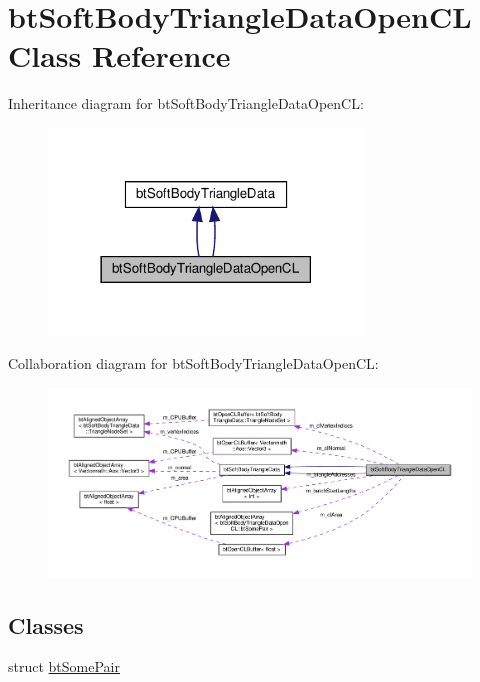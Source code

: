 \hypertarget{classbtSoftBodyTriangleDataOpenCL}{}\section{bt\+Soft\+Body\+Triangle\+Data\+Open\+CL Class Reference}
\label{classbtSoftBodyTriangleDataOpenCL}


Inheritance diagram for bt\+Soft\+Body\+Triangle\+Data\+Open\+CL\+:
\nopagebreak
\begin{figure}[H]
\begin{center}
\leavevmode
\includegraphics[width=237pt]{classbtSoftBodyTriangleDataOpenCL__inherit__graph}
\end{center}
\end{figure}


Collaboration diagram for bt\+Soft\+Body\+Triangle\+Data\+Open\+CL\+:
\nopagebreak
\begin{figure}[H]
\begin{center}
\leavevmode
\includegraphics[width=350pt]{classbtSoftBodyTriangleDataOpenCL__coll__graph}
\end{center}
\end{figure}
\subsection*{Classes}
\begin{DoxyCompactItemize}
\item 
struct \hyperlink{structbtSoftBodyTriangleDataOpenCL_1_1btSomePair}{bt\+Some\+Pair}
\end{DoxyCompactItemize}
